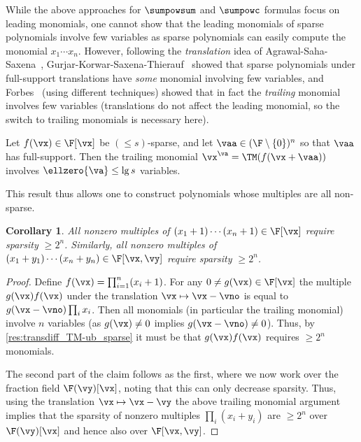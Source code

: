 \documentclass[11pt]{article}
\numberwithin{equation}{section}
\newtheorem{corollary}[theorem]{Corollary}
\theoremstyle{definition}
\theoremstyle{plain}
\begin{document}
While the above approaches for $\sumpowsum$ and $\sumpowc$ formulas focus on leading monomials, one cannot show that the leading monomials of sparse polynomials involve few variables as sparse polynomials can easily compute the monomial $x_1\cdots x_n$.  However, following the \emph{translation} idea of Agrawal-Saha-Saxena~\cite{AgrawalSS13}, Gurjar-Korwar-Saxena-Thierauf~\cite{GurjarKST15} showed that sparse polynomials under full-support translations have \emph{some} monomial involving few variables, and Forbes~\cite{Forbes15} (using different techniques) showed that in fact the \emph{trailing} monomial involves few variables (translations do not affect the leading monomial, so the switch to trailing monomials is necessary here).

\begin{theoremwp}\label{res:transdiff_TM-ub_sparse}
        Let $f(\vx)\in\F[\vx]$ be $(\le s)$-sparse, and let $\vaa\in(\F\setminus\{0\})^n$ so that $\vaa$ has full-support.  Then the trailing monomial $\vx^\va=\TM(f(\vx+\vaa))$ involves $\ellzero{\va}\le \lg s$ variables.
\end{theoremwp}

This result thus allows one to construct polynomials whose multiples are all non-sparse.

\begin{corollary}\label{res:lbs-mult:sparse-LM}
        All nonzero multiples of $(x_1+1)\cdots (x_n+1)\in\F[\vx]$ require sparsity $\ge 2^n$.  Similarly, all nonzero multiples of $(x_1+y_1)\cdots (x_n+y_n)\in\F[\vx,\vy]$ require sparsity $\ge 2^n$.
\end{corollary}
\begin{proof}
        Define $f(\vx)=\prod_{i=1}^n (x_i+1)$. For any $0\ne g(\vx)\in\F[\vx]$ the multiple $g(\vx)f(\vx)$ under the translation $\vx\mapsto \vx-\vno$ is equal to $g(\vx-\vno)\prod_i x_i$.  Then all monomials (in particular the trailing monomial) involve $n$ variables (as $g(\vx)\ne 0$ implies $g(\vx-\vno)\ne 0$).  Thus, by \autoref{res:transdiff_TM-ub_sparse} it must be that $g(\vx)f(\vx)$ requires $\ge 2^n$ monomials.

        The second part of the claim follows as the first, where we now work over the fraction field $\F(\vy)[\vx]$, noting that this can only decrease sparsity.  Thus, using the translation $\vx\mapsto\vx-\vy$ the above trailing monomial argument implies that the sparsity of nonzero multiples $\prod_i (x_i+y_i)$ are $\ge 2^n$ over $\F(\vy)[\vx]$ and hence also over $\F[\vx,\vy]$.
\end{proof}
\end{document}
